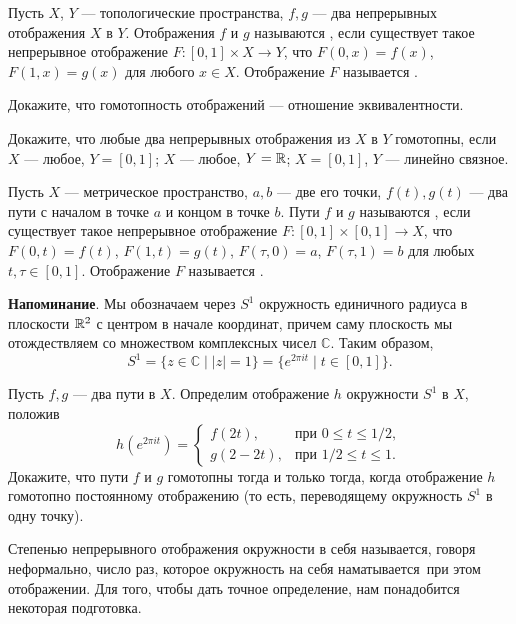\documentclass[a4paper,10pt]{article}
\newcommand{\0}[1]{\overline{#1}}
\renewcommand{\C}{\mathbb{C}}
\begin{document}



Пусть $X$, $Y$ --- топологические пространства, $f,g$ --- два непрерывных
отображения $X$ в $Y$. Отображения $f$ и $g$ называются
, если существует такое непрерывное отображение
$F:[0,1]\times X\to Y$, что $F(0,x)=f(x)$, $F(1,x)=g(x)$ для любого
$x\in X$. Отображение $F$ называется .


Докажите, что гомотопность отображений --- отношение эквивалентности.

Докажите, что любые два непрерывных отображения из $X$ в $Y$ гомотопны,
если
 $X$ --- любое, $Y=[0,1]$;
 $X$ --- любое, $Y=\mathbb{R}$;
 $X=[0,1]$, $Y$ --- линейно связное.

Пусть $X$ --- метрическое пространство, $a,b$ --- две его точки,
$f(t),g(t)$ --- два пути с началом в точке $a$ и концом в точке $b$.
Пути $f$ и $g$ называются , если существует такое
непрерывное отображение $F:[0,1]\times[0,1]\to X$, что $F(0,t)=f(t)$,
$F(1,t)=g(t)$, $F(\tau,0)=a$, $F(\tau,1)=b$ для любых $t,\tau\in[0,1]$.
Отображение $F$ называется .



\noindent
{\bf Напоминание}.
Мы обозначаем через $S^1$ окружность единичного
радиуса в плоскости $\mathbb{R}^2$ с центром в начале координат, причем саму
плоскость мы отождествляем со множеством комплексных чисел $\C$.
Таким образом,
$$
S^1=\{z\in\C\mid |z|=1\}=\{e^{2\pi it}\mid t\in[0,1]\}.
$$



Пусть $f,g$ --- два пути в $X$. Определим отображение $h$ окружности
$S^1$ в $X$, положив
$$
h\left(e^{2\pi it}\right)=\left\{
\begin{array}{ll}
f(2t),&\mbox{при }0\le t\le 1/2,\\
g(2-2t),&\mbox{при }1/2\le t\le 1.
\end{array}
\right.
$$
Докажите, что пути $f$ и $g$ гомотопны тогда и только тогда, когда
отображение $h$ гомотопно постоянному отображению (то есть, переводящему
окружность $S^1$ в одну точку).


Степенью непрерывного отображения окружности в себя называется, говоря
неформально, число раз, которое окружность на себя  наматывается\
при этом отображении. Для того, чтобы дать точное определение, нам
понадобится некоторая подготовка.
\end{document}
